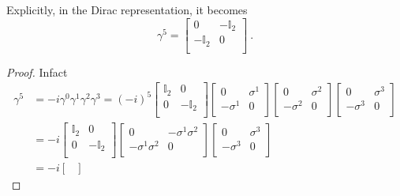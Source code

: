     Explicitly, in the Dirac representation, it becomes
    \begin{equation*}
        \gamma^5 = \begin{bmatrix}
            0 & - \mathbb I_2 \\ - \mathbb I_2 & 0 \\
        \end{bmatrix} ~.
    \end{equation*}
    \begin{proof}
        Infact 
        \begin{equation*}
        \begin{aligned}
            \gamma^5 & = - i \gamma^0 \gamma^1 \gamma^2 \gamma^3 = (-i)^5 \begin{bmatrix}
                \mathbb I_2 & 0 \\ 0 & - \mathbb I_2 \\
            \end{bmatrix} \begin{bmatrix}
                0 & \sigma^1 \\ - \sigma^1 & 0 \\
            \end{bmatrix} \begin{bmatrix}
                0 & \sigma^2 \\ - \sigma^2 & 0 \\
            \end{bmatrix}\begin{bmatrix}
                0 & \sigma^3 \\ - \sigma^3 & 0 \\
            \end{bmatrix} \\ & = -i \begin{bmatrix}
                \mathbb I_2 & 0 \\ 0 & - \mathbb I_2 \\
            \end{bmatrix} \begin{bmatrix}
                0 & - \sigma^1 \sigma^2 \\ - \sigma^1 \sigma^2 & 0 \\
            \end{bmatrix} \begin{bmatrix}
                0 & \sigma^3 \\ - \sigma^3 & 0 \\
            \end{bmatrix} \\ & = -i \begin{bmatrix}

\end{bmatrix}
\end{aligned}
\end{equation*}
\end{proof}
